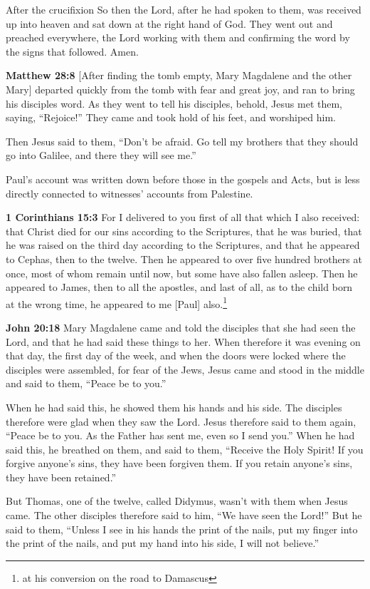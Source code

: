 \documentclass[10pt,twoside]{book}
\newcommand{\quotesize}{\normalsize{}}
\newcommand{\comm}[1]{\begingroup \color{black!50} #1\endgroup}
\newenvironment{quotetext}{\begingroup\quotesize}{\endgroup}
\newcommand{\bible}[2]{\begin{quotetext}\textbf{#1} #2\end{quotetext}}
\newcommand{\matthew}[2]{\bible{Matthew #1}{#2}}
\newcommand{\john}[2]{\bible{John #1}{#2}}
\begin{document}
\begin{section}{After the crucifixion}
{  So then the Lord, after he had spoken to them, was received up into heaven and sat down at the right hand of God.   They went out and preached everywhere, the Lord working with them and confirming the word by the signs that followed. Amen.
}

\matthew{28:8}{
 [After finding the tomb empty, Mary Magdalene and the other Mary] departed quickly from the tomb with fear and great joy, and ran to bring his disciples word.   As they went to tell his disciples, behold, Jesus met them, saying, ``Rejoice!''
They came and took hold of his feet, and worshiped him.

  Then Jesus said to them, ``Don't be afraid. Go tell my brothers  that they should go into Galilee, and there they will see me.'' 
}

\comm{Paul's account was written down before those in the gospels and Acts, but is less directly connected to witnesses' accounts from Palestine.}

\bible{1 Corinthians 15:3}{
For I delivered to you first of all that which I also received: that Christ died for our sins according to the Scriptures,   that he was buried, that he was raised on the third day according to the Scriptures,   and that he appeared to Cephas, then to the twelve.   Then he appeared to over five hundred brothers at once, most of whom remain until now, but some have also fallen asleep.   Then he appeared to James, then to all the apostles,   and last of all, as to the child born at the wrong time, he appeared to me [Paul] also.\footnote{at his conversion on the road to Damascus}
}

\john{20:18}{
Mary Magdalene came and told the disciples that she had seen the Lord, and that he had said these things to her.   When therefore it was evening on that day, the first day of the week, and when the doors were locked where the disciples were assembled, for fear of the Jews, Jesus came and stood in the middle and said to them, ``Peace be to you.''

  When he had said this, he showed them his hands and his side. The disciples therefore were glad when they saw the Lord.   Jesus therefore said to them again, ``Peace be to you. As the Father has sent me, even so I send you.''   When he had said this, he breathed on them, and said to them, ``Receive the Holy Spirit!    If you forgive anyone's sins, they have been forgiven them. If you retain anyone's sins, they have been retained.''

  But Thomas, one of the twelve, called Didymus, wasn't with them when Jesus came.   The other disciples therefore said to him, ``We have seen the Lord!''
But he said to them, ``Unless I see in his hands the print of the nails, put my finger into the print of the nails, and put my hand into his side, I will not believe.''

}
\end{section}
\end{document}
